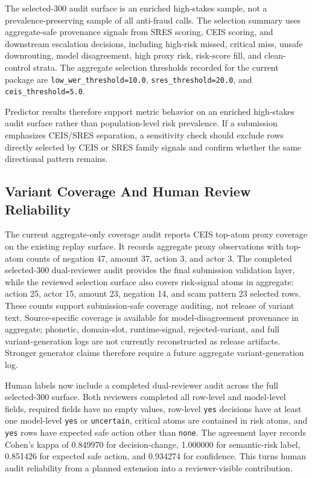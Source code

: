 \documentclass[
]{article}
\begin{document}
The selected-300 audit surface is an enriched high-stakes sample, not a
prevalence-preserving sample of all anti-fraud calls. The selection
summary uses aggregate-safe provenance signals from SRES scoring, CEIS
scoring, and downstream escalation decisions, including high-risk
missed, critical miss, unsafe downrouting, model disagreement, high
proxy risk, risk-score fill, and clean-control strata. The aggregate
selection thresholds recorded for the current package are
\texttt{low\_wer\_threshold=10.0}, \texttt{sres\_threshold=20.0}, and
\texttt{ceis\_threshold=5.0}.

Predictor results therefore support metric behavior on an enriched
high-stakes audit surface rather than population-level risk prevalence.
If a submission emphasizes CEIS/SRES separation, a sensitivity check
should exclude rows directly selected by CEIS or SRES family signals and
confirm whether the same directional pattern remains.

\hypertarget{variant-coverage-and-human-review-reliability}{%
\subsection{Variant Coverage And Human Review
Reliability}\label{variant-coverage-and-human-review-reliability}}

The current aggregate-only coverage audit reports CEIS top-atom proxy
coverage on the existing replay surface. It records aggregate proxy
observations with top-atom counts of negation 47, amount 37, action 3,
and actor 3. The completed selected-300 dual-reviewer audit provides the
final submission validation layer, while the reviewed selection surface
also covers risk-signal atoms in aggregate: action 25, actor 15, amount
23, negation 14, and scam pattern 23 selected rows. These counts support
submission-safe coverage auditing, not release of variant text.
Source-specific coverage is available for model-disagreement provenance
in aggregate; phonetic, domain-slot, runtime-signal, rejected-variant,
and full variant-generation logs are not currently reconstructed as
release artifacts. Stronger generator claims therefore require a future
aggregate variant-generation log.

Human labels now include a completed dual-reviewer audit across the full
selected-300 surface. Both reviewers completed all row-level and
model-level fields, required fields have no empty values, row-level
\texttt{yes} decisions have at least one model-level \texttt{yes} or
\texttt{uncertain}, critical atoms are contained in risk atoms, and
\texttt{yes} rows have expected safe action other than \texttt{none}.
The agreement layer records Cohen's kappa of 0.849970 for
decision-change, 1.000000 for semantic-risk label, 0.851426 for
expected safe action, and 0.934274 for confidence. This turns human
audit reliability from a planned extension into a reviewer-visible
contribution.
\end{document}
